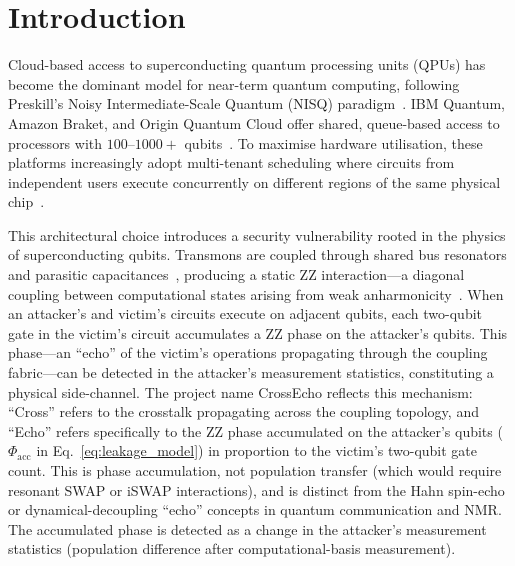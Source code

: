 \documentclass[ASNA,twocolumn]{USG}
\begin{document}
\maketitle

\section{Introduction}
\label{sec:introduction}

Cloud-based access to superconducting quantum processing units (QPUs) has become the dominant model for near-term quantum computing, following Preskill's Noisy Intermediate-Scale Quantum (NISQ) paradigm~\cite{preskill2018nisq}. IBM Quantum, Amazon Braket, and Origin Quantum Cloud offer shared, queue-based access to processors with $100$--$1000+$ qubits~\cite{arute2019supremacy,ibmq2026,originqc2026}. To maximise hardware utilisation, these platforms increasingly adopt multi-tenant scheduling where circuits from independent users execute concurrently on different regions of the same physical chip~\cite{tannu2019qubits,murali2019fullstack}.

This architectural choice introduces a security vulnerability rooted in the physics of superconducting qubits. Transmons are coupled through shared bus resonators and parasitic capacitances~\cite{koch2007transmon,krantz2019guide}, producing a static ZZ interaction---a diagonal coupling between computational states arising from weak anharmonicity~\cite{ding2020crosstalk,sarovar2020detecting}. When an attacker's and victim's circuits execute on adjacent qubits, each two-qubit gate in the victim's circuit accumulates a ZZ phase on the attacker's qubits. This phase---an ``echo'' of the victim's operations propagating through the coupling fabric---can be detected in the attacker's measurement statistics, constituting a physical side-channel. The project name CrossEcho reflects this mechanism: ``Cross'' refers to the crosstalk propagating across the coupling topology, and ``Echo'' refers specifically to the ZZ phase accumulated on the attacker's qubits ($\Phi_{\mathrm{acc}}$ in Eq.~\ref{eq:leakage_model}) in proportion to the victim's two-qubit gate count. This is phase accumulation, not population transfer (which would require resonant SWAP or iSWAP interactions), and is distinct from the Hahn spin-echo or dynamical-decoupling ``echo'' concepts in quantum communication and NMR. The accumulated phase is detected as a change in the attacker's measurement statistics (population difference after computational-basis measurement).
\end{document}
